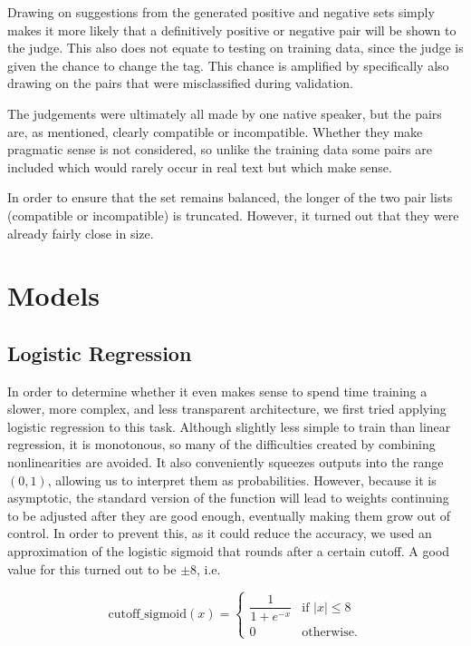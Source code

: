 \documentclass[a4paper, 12pt]{article}
\begin{document}
Drawing on suggestions from the generated positive and negative sets simply makes it more likely that a definitively positive or negative pair will be shown to the judge. This also does not equate to testing on training data, since the judge is given the chance to change the tag. This chance is amplified by specifically also drawing on the pairs that were misclassified during validation.

The judgements were ultimately all made by one native speaker, but the pairs are, as mentioned, clearly compatible or incompatible. Whether they make pragmatic sense is not considered, so unlike the training data some pairs are included which would rarely occur in real text but which make sense.

In order to ensure that the set remains balanced, the longer of the two pair lists (compatible or incompatible) is truncated. However, it turned out that they were already fairly close in size.

\section{Models}

\subsection{Logistic Regression}
In order to determine whether it even makes sense to spend time training a slower, more complex, and less transparent architecture, we first tried applying logistic regression to this task. Although slightly less simple to train than linear regression, it is monotonous, so many of the difficulties created by combining nonlinearities are avoided. It also conveniently squeezes outputs into the range $ (0, 1) $, allowing us to interpret them as probabilities. However, because it is asymptotic, the standard version of the function will lead to weights continuing to be adjusted after they are good enough, eventually making them grow out of control. In order to prevent this, as it could reduce the accuracy, we used an approximation of the logistic sigmoid that rounds after a certain cutoff. A good value for this turned out to be $ \pm 8 $, i.e.

\begin{equation} \label{eq:5}
	\mbox{cutoff\_sigmoid}(x) =
	\begin{cases}
		\dfrac{1}{1 + e^{-x}} & \text{if } |x| \leq 8 \\
		0                     & \text{otherwise.}
	\end{cases}
\end{equation}
\end{document}
